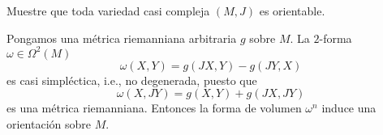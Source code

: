 \begin{problem}
Muestre que toda variedad casi compleja $(M,J)$ es orientable.
\end{problem}

\begin{solution}
Pongamos una métrica riemanniana arbitraria $g$ sobre $M$. La $2$-forma $\omega \in \Omega^2(M)$
$$\omega(X, Y) = g(JX, Y) - g(JY, X)$$
es casi simpléctica, i.e., no degenerada, puesto que
$$\omega(X, JY) = g(X, Y) + g(JX, JY)$$
es una métrica riemanniana. Entonces la forma de volumen $\omega^n$ induce una orientación sobre $M$.
\end{solution}
